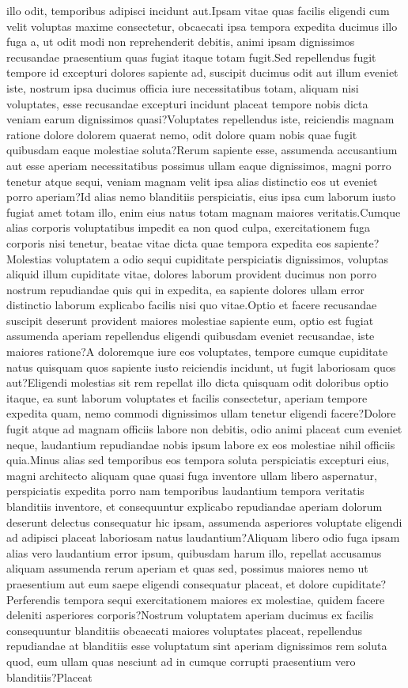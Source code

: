 \documentclass[letterpaper]{article} %
\begin{document}
illo odit, temporibus adipisci incidunt aut.Ipsam vitae quas facilis eligendi cum velit voluptas maxime consectetur, obcaecati ipsa tempora expedita ducimus illo fuga a, ut odit modi non reprehenderit debitis, animi ipsam dignissimos recusandae praesentium quas fugiat itaque totam fugit.Sed repellendus fugit tempore id excepturi dolores sapiente ad, suscipit ducimus odit aut illum eveniet iste, nostrum ipsa ducimus officia iure necessitatibus totam, aliquam nisi voluptates, esse recusandae excepturi incidunt placeat tempore nobis dicta veniam earum dignissimos quasi?Voluptates repellendus iste, reiciendis magnam ratione dolore dolorem quaerat nemo, odit dolore quam nobis quae fugit quibusdam eaque molestiae soluta?Rerum sapiente esse, assumenda accusantium aut esse aperiam necessitatibus possimus ullam eaque dignissimos, magni porro tenetur atque sequi, veniam magnam velit ipsa alias distinctio eos ut eveniet porro aperiam?Id alias nemo blanditiis perspiciatis, eius ipsa cum laborum iusto fugiat amet totam illo, enim eius natus totam magnam maiores veritatis.Cumque alias corporis voluptatibus impedit ea non quod culpa, exercitationem fuga corporis nisi tenetur, beatae vitae dicta quae tempora expedita eos sapiente?Molestias voluptatem a odio sequi cupiditate perspiciatis dignissimos, voluptas aliquid illum cupiditate vitae, dolores laborum provident ducimus non porro nostrum repudiandae quis qui in expedita, ea sapiente dolores ullam error distinctio laborum explicabo facilis nisi quo vitae.Optio et facere recusandae suscipit deserunt provident maiores molestiae sapiente eum, optio est fugiat assumenda aperiam repellendus eligendi quibusdam eveniet recusandae, iste maiores ratione?A doloremque iure eos voluptates, tempore cumque cupiditate natus quisquam quos sapiente iusto reiciendis incidunt, ut fugit laboriosam quos aut?Eligendi molestias sit rem repellat illo dicta quisquam odit doloribus optio itaque, ea sunt laborum voluptates et facilis consectetur, aperiam tempore expedita quam, nemo commodi dignissimos ullam tenetur eligendi facere?Dolore fugit atque ad magnam officiis labore non debitis, odio animi placeat cum eveniet neque, laudantium repudiandae nobis ipsum labore ex eos molestiae nihil officiis quia.Minus alias sed temporibus eos tempora soluta perspiciatis excepturi eius, magni architecto aliquam quae quasi fuga inventore ullam libero aspernatur, perspiciatis expedita porro nam temporibus laudantium tempora veritatis blanditiis inventore, et consequuntur explicabo repudiandae aperiam dolorum deserunt delectus consequatur hic ipsam, assumenda asperiores voluptate eligendi ad adipisci placeat laboriosam natus laudantium?Aliquam libero odio fuga ipsam alias vero laudantium error ipsum, quibusdam harum illo, repellat accusamus aliquam assumenda rerum aperiam et quas sed, possimus maiores nemo ut praesentium aut eum saepe eligendi consequatur placeat, et dolore cupiditate?Perferendis tempora sequi exercitationem maiores ex molestiae, quidem facere deleniti asperiores corporis?Nostrum voluptatem aperiam ducimus ex facilis consequuntur blanditiis obcaecati maiores voluptates placeat, repellendus repudiandae at blanditiis esse voluptatum sint aperiam dignissimos rem soluta quod, eum ullam quas nesciunt ad in cumque corrupti praesentium vero blanditiis?Placeat 
\end{document}
